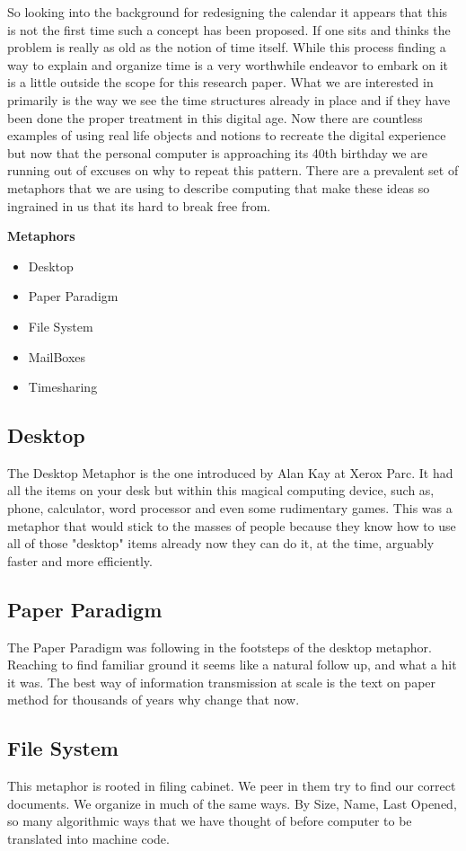 So looking into the background for redesigning the calendar it appears that this is not the first time such a concept has been proposed. If one sits and thinks the problem is really as old as the notion of time itself.
While this process finding a way to explain and organize time is a very worthwhile endeavor to embark on it is a little outside the scope for this research paper.
What we are interested in primarily is the way we see the time structures already in place and if they have been done the proper treatment in this digital age.
Now there are countless examples of using real life objects and notions to recreate the digital experience but now that the personal computer is approaching its 40th birthday we are running out of excuses on why to repeat this pattern.
There are a prevalent set of metaphors that we are using to describe computing that make these ideas so ingrained in us that its hard to break free from.



\bf{Metaphors}
\begin{itemize}
    \item Desktop
    \item Paper Paradigm
    \item File System
    \item MailBoxes
    \item Timesharing
\end{itemize}
\subsection{Desktop}
The Desktop Metaphor is the one introduced by Alan Kay at Xerox Parc. It had all the items on your desk but within this magical computing device, such as, phone, calculator, word processor and even some rudimentary games.
 This was a metaphor that would stick to the masses of people because they know how to use all of those "desktop" items already now they can do it, at the time, arguably faster and more efficiently.
\subsection{Paper Paradigm}
The Paper Paradigm was following in the footsteps of the desktop metaphor.
Reaching to find familiar ground it seems like a natural follow up, and what a hit it was.  The best way of information transmission at scale is the text on paper method for thousands of years why change that now.
\subsection{File System}
This metaphor is rooted in filing cabinet.
We peer in them try to find our correct documents. We organize in much of the same ways. By Size, Name, Last Opened, so many algorithmic ways that we have thought of before computer to be translated into machine code.
